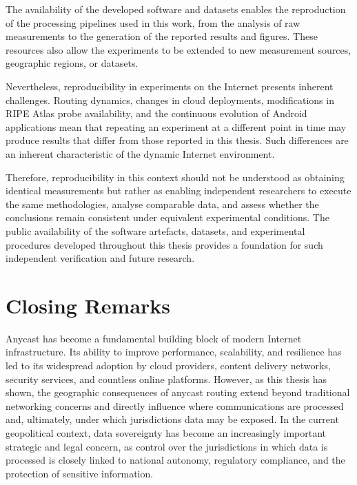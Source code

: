 \documentclass[
A4paper,                %
twoside,                %
openright,              %
chapterprefix=true,     %
12pt,                   %
headings=normal,        %
titlepage=on            %
]{book}
\begin{document}
The availability of the developed software and datasets enables the reproduction of the processing pipelines used in this work, from the analysis of raw measurements to the generation of the reported results and figures. These resources also allow the experiments to be extended to new measurement sources, geographic regions, or datasets.

Nevertheless, reproducibility in experiments on the Internet presents inherent challenges. Routing dynamics, changes in cloud deployments, modifications in RIPE Atlas probe availability, and the continuous evolution of Android applications mean that repeating an experiment at a different point in time may produce results that differ from those reported in this thesis. Such differences are an inherent characteristic of the dynamic Internet environment.

Therefore, reproducibility in this context should not be understood as obtaining identical measurements but rather as enabling independent researchers to execute the same methodologies, analyse comparable data, and assess whether the conclusions remain consistent under equivalent experimental conditions. The public availability of the software artefacts, datasets, and experimental procedures developed throughout this thesis provides a foundation for such independent verification and future research.

\section{Closing Remarks}
\label{sc:conclusion_closing}

Anycast has become a fundamental building block of modern Internet infrastructure. Its ability to improve performance, scalability, and resilience has led to its widespread adoption by cloud providers, content delivery networks, security services, and countless online platforms. However, as this thesis has shown, the geographic consequences of anycast routing extend beyond traditional networking concerns and directly influence where communications are processed and, ultimately, under which jurisdictions data may be exposed. In the current geopolitical context, data sovereignty has become an increasingly important strategic and legal concern, as control over the jurisdictions in which data is processed is closely linked to national autonomy, regulatory compliance, and the protection of sensitive information.
\end{document}
